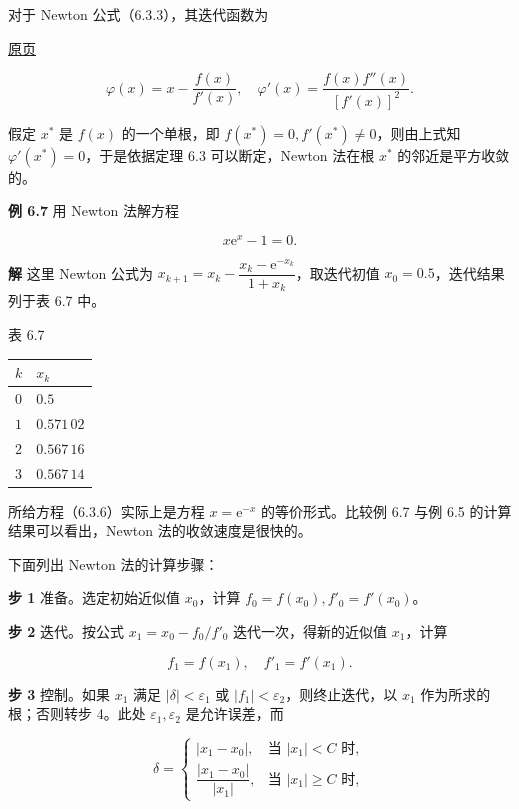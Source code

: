 \documentclass[
  10pt,
  fontset=fandol]{ctexart}
\newcounter{none} %
\begin{document}
对于 Newton 公式（6.3.3），其迭代函数为

\href{../../source-images/pdf-165.jpeg}{原页}

\[
\varphi(x)=x-\frac{f(x)}{f'(x)},\quad\varphi'(x)=\frac{f(x)f''(x)}{[f'(x)]^2}.
\]

假定 \(x^*\) 是 \(f(x)\) 的一个单根，即 \(f(x^*)=0,f'(x^*)\ne0\)，则由上式知 \(\varphi'(x^*)=0\)，于是依据定理 6.3 可以断定，Newton 法在根 \(x^*\) 的邻近是平方收敛的。

\textbf{例 6.7} 用 Newton 法解方程

\[
x\mathrm{e}^x-1=0.
\tag{6.3.6}
\]

\textbf{解} 这里 Newton 公式为 \(x_{k+1}=x_k-\dfrac{x_k-\mathrm{e}^{-x_k}}{1+x_k}\)，取迭代初值 \(x_0=0.5\)，迭代结果列于表 6.7 中。

表 6.7

{\def\LTcaptype{none} %
\begin{longtable}[]{@{}ll@{}}
\toprule\noalign{}
\(k\) & \(x_k\) \\
\midrule\noalign{}
\endhead
\bottomrule\noalign{}
\endlastfoot
\(0\) & \(0.5\) \\
\(1\) & \(0.571\,02\) \\
\(2\) & \(0.567\,16\) \\
\(3\) & \(0.567\,14\) \\
\end{longtable}
}

所给方程（6.3.6）实际上是方程 \(x=\mathrm{e}^{-x}\) 的等价形式。比较例 6.7 与例 6.5 的计算结果可以看出，Newton 法的收敛速度是很快的。

下面列出 Newton 法的计算步骤：

\textbf{步 1} 准备。选定初始近似值 \(x_0\)，计算 \(f_0=f(x_0),f'_0=f'(x_0)\)。

\textbf{步 2} 迭代。按公式 \(x_1=x_0-f_0/f'_0\) 迭代一次，得新的近似值 \(x_1\)，计算

\[
f_1=f(x_1),\quad f'_1=f'(x_1).
\]

\textbf{步 3} 控制。如果 \(x_1\) 满足 \(|\delta|<\varepsilon_1\) 或 \(|f_1|<\varepsilon_2\)，则终止迭代，以 \(x_1\) 作为所求的根；否则转步 4。此处 \(\varepsilon_1,\varepsilon_2\) 是允许误差，而

\[
\delta=\begin{cases}
|x_1-x_0|,&\text{当 }|x_1|<C\text{ 时},\\
\dfrac{|x_1-x_0|}{|x_1|},&\text{当 }|x_1|\geqslant C\text{ 时},
\end{cases}
\]
\end{document}

